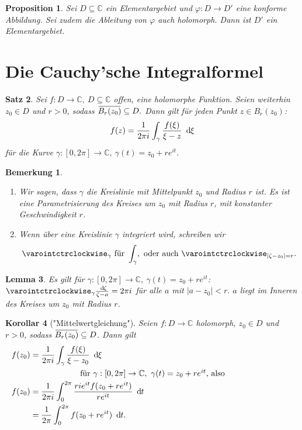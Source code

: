 \documentclass[a4paper,12pt]{book}
\theoremstyle{newthm}
\newtheorem{thm}{Satz}[section]
\newtheorem{lem}[thm]{Lemma}
\newtheorem{prop}[thm]{Proposition}
\newtheorem{cor}[thm]{Korollar}
\theoremstyle{newdef}
\theoremstyle{newrem}
\newtheorem*{rem}{Bemerkung}
\newcommand{\C}{\mathbb{C}}
\renewcommand{\d}{\ \operatorname{d}\hspace{-2px}}
\newcommand{\overbar}[1]{\mkern 1.5mu\overline{\mkern-1.5mu#1\mkern-1.5mu}\mkern 1.5mu}
\begin{document}
		\begin{prop}
			Sei $ D \subseteq \C $ ein Elementargebiet und $ \varphi: D \to D' $ eine konforme Abbildung. Sei zudem die Ableitung von $\varphi$ auch holomorph. Dann ist $D'$ ein Elementargebiet.
		\end{prop}
		
	
	\section{Die Cauchy'sche Integralformel}
		
		\begin{thm}
			Sei $ f: D \to \C,\ D \subseteq \C $ offen, eine holomorphe Funktion. Seien weiterhin $ z_0 \in D $ und $ r > 0 $, sodass $ \overbar{B_r(z_0)} \subseteq D. $ Dann gilt für jeden Punkt $ z \in B_r(z_0) $:
			\[ f(z) = \frac{1}{2\pi i} \int_\gamma \frac{f(\xi)}{\xi - z} \d \xi \]
			für die Kurve $ \gamma: [0,2\pi] \to \C,\ \gamma(t) = z_0 + re^{it}. $
		\end{thm}
		
		\begin{rem}
			\begin{enumerate}[label = {\alph*})]
				\item Wir sagen, dass $\gamma$ die Kreislinie mit Mittelpunkt $z_0$ und Radius $r$ ist. Es ist eine Parametrisierung des Kreises um $z_0$ mit Radius $r$, mit konstanter Geschwindigkeit $r$.
				\item Wenn über eine Kreislinie $\gamma$ integriert wird, schreiben wir 
				$$ \varointctrclockwise_\gamma\ \text{für } \int_\gamma,\ \text{oder auch } \varointctrclockwise_{|\zeta - z_0|=r}. $$
			\end{enumerate}
		\end{rem}
		
		\begin{lem}
			Es gilt für $ \gamma: [0,2\pi] \to \C,\ \gamma(t) = z_0 + re^{it} $: $ \varointctrclockwise_\gamma \frac{\d \zeta}{\zeta - a} = 2\pi i $ für alle $a$ mit $ |a-z_0| < r. $ $a$ liegt im Inneren des Kreises um $z_0$ mit Radius $r$.
		\end{lem}
		
		\begin{cor}["Mittelwertgleichung"]
			Seien $ f: D \to \C $ holomorph, $ z_0 \in D $ und $ r > 0 $, sodass $ \overbar{B_r(z_0)} \subseteq D $. Dann gilt
			\begin{align*}
				f(z_0) &= \frac{1}{2\pi i} \int_\gamma \frac{f(\xi)}{\xi - z_0} \d \xi\\
				\noalign{\centering für $ \gamma: [0,2\pi] \to \C,\ \gamma(t) = z_0 + re^{it} $, also}
				f(z_0) &= \frac{1}{2\pi i} \int_0^{2\pi} \frac{rie^{it} f(z_0+re^{it})}{re^{it}} \d t\\
				&= \frac{1}{2\pi} \int_0^{2\pi} f(z_0+re^{it}) \d t.
			\end{align*}
		\end{cor}
		
\end{document}
